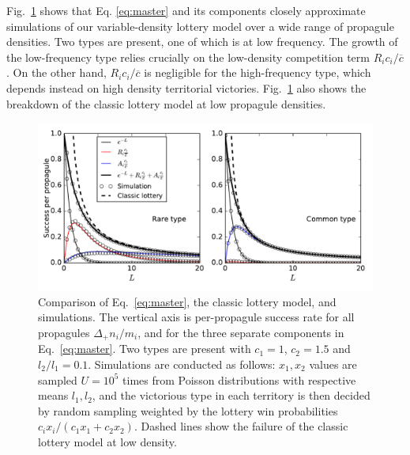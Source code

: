 \documentclass[12pt]{article}
\begin{document}
Fig.~\ref{fig:simcomp} shows that Eq. \eqref{eq:master} and its components closely approximate simulations of our variable-density lottery model over a wide range of propagule densities.  Two types are present, one of which is at low frequency. The growth of the low-frequency type relies crucially on the low-density competition term $R_i c_i/\overline{c}$. On the other hand, $R_i c_i/\overline{c}$ is negligible for the high-frequency type, which depends instead on high density territorial victories. Fig.~\ref{fig:simcomp} also shows the breakdown of the classic lottery model at low propagule densities.

\begin{figure}
\centering
\includegraphics[scale=0.8]{simulationcomparison.pdf}
\caption{\label{fig:simcomp} Comparison of Eq.~\eqref{eq:master}, the classic lottery model, and simulations. The vertical axis is per-propagule success rate for all propagules $\Delta_+ n_i/m_i$, and for the three separate components in Eq.~\eqref{eq:master}. Two types are present with $c_1=1$, $c_2=1.5$ and $l_2/l_1=0.1$. Simulations are conducted as follows: $x_1,x_2$ values are sampled $U=10^5$ times from Poisson distributions with respective means $l_1,l_2$, and the victorious type in each territory is then decided by random sampling weighted by the lottery win probabilities $c_ix_i/(c_1 x_1 + c_2 x_2)$. Dashed lines show the failure of the classic lottery model at low density.} 
\end{figure}
\end{document}
